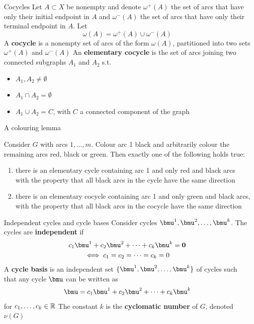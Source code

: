 \documentclass[aspectratio=169]{beamer}
\begin{document}
\begin{frame}{Cocycles}
	Let $A\subset X$ be nonempty and denote $\omega^+(A)$ the set of arcs that have only their initial endpoint in $A$ and $\omega^-(A)$ the set of arcs that have only their terminal endpoint in $A$. Let
	\[
	\omega(A)=\omega^+(A)\cup\omega^-(A)
	\]
	\vfill
	A \textbf{cocycle} is a nonempty set of arcs of the form $\omega(A)$, partitioned into two sets $\omega^+(A)$ and $\omega^-(A)$
	\vfill
	An \textbf{elementary cocycle} is the set of arcs joining two connected subgraphs $A_1$ and $A_2$ s.t. 
	\begin{itemize}
		\item $A_1,A_2\neq\emptyset$
		\item $A_1\cap A_2=\emptyset$
		\item $A_1\cup A_2=C$, with $C$ a connected component of the graph
	\end{itemize}
\end{frame}


\begin{frame}{A colouring lemma}
	\begin{lemma}\label{lemma:arc_colouring_lemma}
		Consider $G$ with arcs $1,\ldots,m$. Colour arc 1 black and arbitrarily colour the remaining arcs red, black or green. Then exactly one of the following holds true:
		\begin{enumerate}
			\item there is an elementary cycle containing arc 1 and only red and black
			arcs with the property that all black arcs in the cycle have the same
			direction
			\item there is an elementary cocycle containing arc 1 and only green and black
			arcs, with the property that all black arcs in the cocycle have the same
			direction
		\end{enumerate}
	\end{lemma}
\end{frame}

\begin{frame}{Independent cycles and cycle bases}
	Consider cycles $\bmu^1,\bmu^2,\ldots,\bmu^k$. The cycles are \textbf{independent} if
	\begin{multline*}
		c_1\bmu^1+c_2\bmu^2+\cdots+c_k\bmu^k=\b0 \\
		\iff
		c_1=c_2=\cdots=c_k=0
	\end{multline*}
	A \textbf{cycle basis} is an independent set $\{\bmu^1,\bmu^2,\ldots,\bmu^k\}$ of cycles such that any cycle $\bmu$ can be written as
	\[
	\bmu= c_1\bmu^1+c_2\bmu^2+\cdots+c_k\bmu^k
	\]
	for $c_1,\ldots,c_k\in\mathbb{R}$
	\vfill
	The constant $k$ is the \textbf{cyclomatic number} of $G$, denoted $\nu(G)$
\end{frame}
\end{document}
